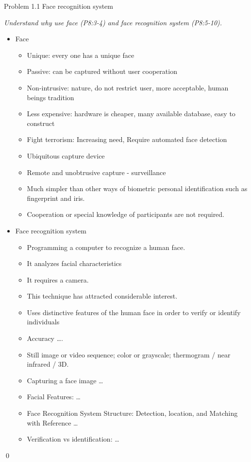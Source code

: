 \documentclass[
        ]{beamer}
\begin{document}
\begin{frame}[t]{Problem 1.1 Face recognition system}    		
	\begin{overprint}
	\emph{Understand why use face (P8:3-4) and face recognition system (P8:5-10).}
	\onslide<2> 
	\onslide<3> 
	\onslide<4> 
	\onslide<5> 
	\onslide<6> 
	\onslide<7> 
	\onslide<8> 
	\onslide<9> 
	\onslide<10>
		\begin{itemize}
		\item Face 				
			\begin{itemize}
			\item Unique: every one has a unique face
			\item Passive: can be captured without user cooperation
			\item Non-intrusive: nature, do not restrict user, more acceptable, human beings tradition
			\item Less expensive: hardware is cheaper, many available database, easy to construct
			\item Fight terrorism: Increasing need, Require automated face detection
			\item Ubiquitous capture device
			\item Remote and unobtrusive capture - surveillance
			\item Much simpler than other ways of biometric personal identification such as fingerprint and iris.
			\item Cooperation or special knowledge of participants are not required.
			\end{itemize}		
		\end{itemize}
		\begin{itemize}
		\item Face recognition system				
			\begin{itemize}
			\item Programming a computer to recognize a human face.
			\item It analyzes facial characteristics
			\item It requires a camera.
			\item This technique has attracted considerable interest.
			\item Uses distinctive features of the human face in order to verify or identify individuals
			\item Accuracy \ldots.
            \item Still image or video sequence; color or grayscale; thermogram / near infrared / 3D.
            \item Capturing a face image \ldots
			\item Facial Features: \ldots
			\item Face Recognition System Structure: Detection, location, and Matching with Reference \ldots
			\item Verification vs identification: \ldots
			\end{itemize}		
		\end{itemize}			
	
	\qed		
	\end{overprint}
\end{frame}
\end{document}
